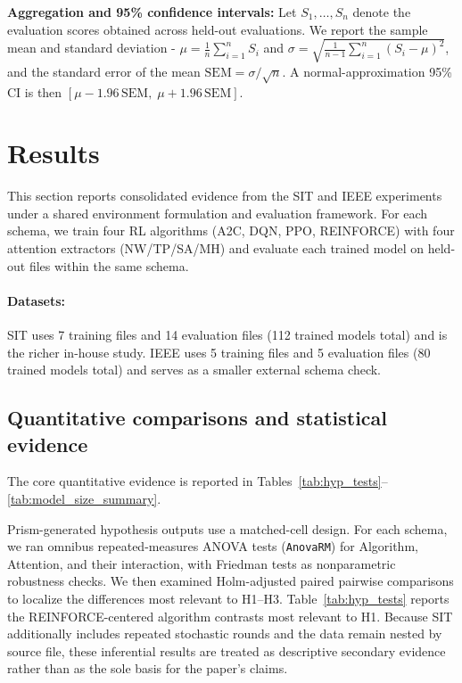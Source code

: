 \documentclass[sn-basic]{sn-jnl} %
\begin{document}
\textbf{Aggregation and 95\% confidence intervals:}
Let $S_1,\ldots,S_n$ denote the evaluation scores obtained across held-out evaluations. We report the sample mean and standard deviation - 
 $\mu = \frac{1}{n}\sum_{i=1}^{n} S_i$ and $\sigma = \sqrt{\frac{1}{n-1}\sum_{i=1}^{n}(S_i-\mu)^2}$,
and the standard error of the mean $\mathrm{SEM}=\sigma/\sqrt{n}$. A normal-approximation 95\% CI is then $[\mu-1.96\,\mathrm{SEM},\;\mu+1.96\,\mathrm{SEM}]$.

\section{Results} \label{sec:results}
This section reports consolidated evidence from the SIT and IEEE experiments under a shared environment formulation and evaluation framework. For each schema, we train four RL algorithms (\textsc{A2C}, \textsc{DQN}, \textsc{PPO}, \textsc{REINFORCE}) with four attention extractors (NW/TP/SA/MH) and evaluate each trained model on held-out files within the same schema.

\paragraph{Datasets:}
SIT uses 7 training files and 14 evaluation files (112 trained models total) and is the richer in-house study. IEEE uses 5 training files and 5 evaluation files (80 trained models total) and serves as a smaller external schema check.

\subsection{Quantitative comparisons and statistical evidence}
\label{sec:hypothesis_tests}

The core quantitative evidence is reported in Tables~\ref{tab:hyp_tests}--\ref{tab:model_size_summary}.

Prism-generated hypothesis outputs use a matched-cell design. For each schema, we ran omnibus repeated-measures ANOVA tests (\texttt{AnovaRM}) for Algorithm, Attention, and their interaction, with Friedman tests as nonparametric robustness checks. We then examined Holm-adjusted paired pairwise comparisons to localize the differences most relevant to H1--H3. Table~\ref{tab:hyp_tests} reports the \textsc{REINFORCE}-centered algorithm contrasts most relevant to H1. Because SIT additionally includes repeated stochastic rounds and the data remain nested by source file, these inferential results are treated as descriptive secondary evidence rather than as the sole basis for the paper's claims.
\end{document}
